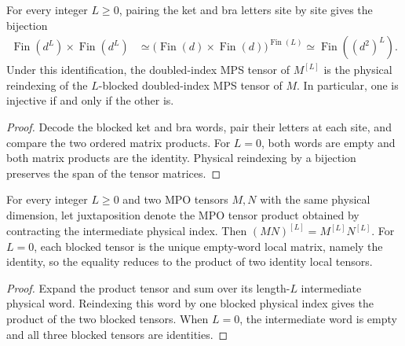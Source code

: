 \begin{lemma}
    \label{thm:mpdo_blocking_doubled_index}
    \leanok
    For every integer $L\geq0$, pairing the ket and bra letters site by site
    gives the bijection
    \begin{align}
        \operatorname{Fin}(d^L)\times\operatorname{Fin}(d^L)
         & \simeq
        \bigl(\operatorname{Fin}(d)\times\operatorname{Fin}(d)\bigr)
        ^{\operatorname{Fin}(L)}
        \simeq \operatorname{Fin}((d^2)^L).
    \end{align}
    Under this identification, the doubled-index MPS tensor of $M^{[L]}$
    is the physical reindexing of the $L$-blocked doubled-index MPS tensor
    of $M$. In particular, one is injective if and only if the other is.
\end{lemma}

\begin{proof}\leanok
    Decode the blocked ket and bra words, pair their letters at each site,
    and compare the two ordered matrix products. For $L=0$, both words are
    empty and both matrix products are the identity. Physical reindexing by a
    bijection preserves the span of the tensor matrices.
\end{proof}

\begin{lemma}
    \label{thm:mpdo_blocking_product}
    \leanok
    For every integer $L\geq0$ and two MPO tensors $M,N$ with the same
    physical dimension, let juxtaposition denote the MPO tensor product
    obtained by contracting the intermediate physical index. Then
    $(MN)^{[L]}=M^{[L]}N^{[L]}$. For $L=0$, each blocked tensor is the unique
    empty-word local matrix, namely the identity, so the equality reduces to
    the product of two identity local tensors.
\end{lemma}

\begin{proof}\leanok
    Expand the product tensor and sum over its length-$L$ intermediate
    physical word. Reindexing this word by one blocked physical index gives
    the product of the two blocked tensors. When $L=0$, the intermediate word
    is empty and all three blocked tensors are identities.
\end{proof}

